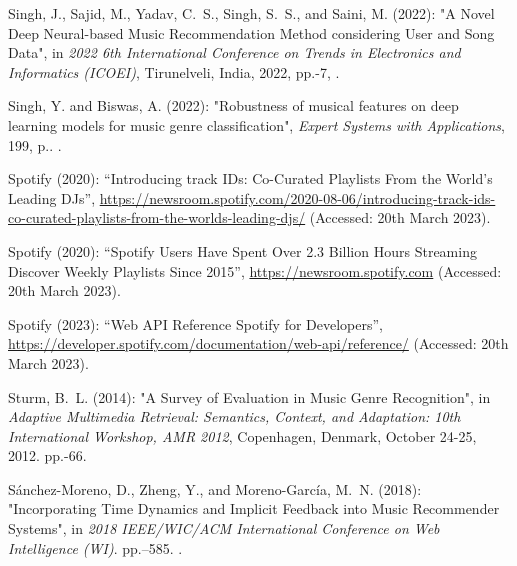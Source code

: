 \documentclass[11pt,titlepage,oneside]{book}
\begin{document}
\begin{thebibliography}{97}
	Singh, J., Sajid, M., Yadav, C.~S., Singh, S.~S., and Saini, M. (2022):
	"A {Novel} {Deep} {Neural}-based {Music} {Recommendation} {Method}
		considering {User} and {Song} {Data}", in \textit{2022 6th {International}
		{Conference} on {Trends} in {Electronics} and {Informatics} ({ICOEI})}, Tirunelveli, India, 2022, pp.-7, .
	
	Singh, Y. and Biswas, A. (2022): "Robustness of musical features on
		deep learning models for music genre classification", \textit{Expert Systems
		with Applications}, 199, p..
	.
	
	Spotify (2020{}): \enquote{Introducing track {IDs}: {Co}-{Curated}
		{Playlists} {From} the {World}’s {Leading} {DJs}},
	\urlprefix\url{https://newsroom.spotify.com/2020-08-06/introducing-track-ids-co-curated-playlists-from-the-worlds-leading-djs/} (Accessed: 20th March 2023).
	
	Spotify (2020{}): \enquote{Spotify {Users} {Have} {Spent} {Over}
		2.3 {Billion} {Hours} {Streaming} {Discover} {Weekly} {Playlists} {Since}
		2015},
	\urlprefix\url{https://newsroom.spotify.com} (Accessed: 20th March 2023).
	
	Spotify (2023): \enquote{Web {API} {Reference} {\textbar} {Spotify} for
		{Developers}},
	\urlprefix\url{https://developer.spotify.com/documentation/web-api/reference/} (Accessed: 20th March 2023).
	
	Sturm, B.~L. (2014): "A {Survey} of {Evaluation} in {Music} {Genre}
		{Recognition}", in \textit{Adaptive Multimedia Retrieval: Semantics, Context, and Adaptation: 10th International Workshop, AMR 2012}, Copenhagen, Denmark, October 24-25, 2012.
	pp.-66. 
	
	Sánchez-Moreno, D., Zheng, Y., and Moreno-García, M.~N. (2018):
	"Incorporating {Time} {Dynamics} and {Implicit} {Feedback} into
		{Music} {Recommender} {Systems}", in \textit{2018 {IEEE}/{WIC}/{ACM}
		{International} {Conference} on {Web} {Intelligence} ({WI})}.
	pp.--585. .
	

\end{thebibliography}
\end{document}
